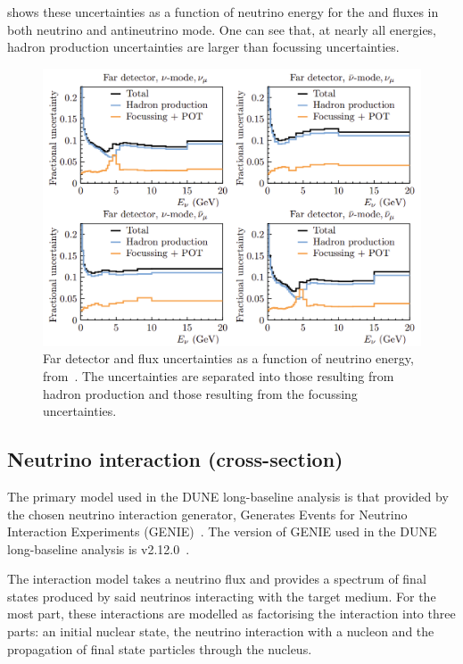 shows these uncertainties as a function of neutrino energy for the \numu and \anumu fluxes in both neutrino and antineutrino mode.
One can see that, at nearly all energies, hadron production uncertainties are larger than focussing uncertainties.

\begin{figure}[h]
  \centering
  \includegraphics[width=.8\linewidth]{files/figures/dune_detector/fluxUncertainties}
  \caption[Far detector flux uncertainties for \numu and \anumu]{Far detector \numu and \anumu flux uncertainties as a function of neutrino energy, from~\cite{tdrVol2}. The uncertainties are separated into those resulting from hadron production and those resulting from the focussing uncertainties.}
  \label{fig:fluxUncertainties}
\end{figure}

\subsection{Neutrino interaction (cross-section)}
\label{sec:dune_lbl:systs:xsec}

The primary model used in the DUNE long-baseline analysis is that provided by the chosen neutrino interaction generator, Generates Events for Neutrino Interaction Experiments (GENIE)~\cite{genie}.
The version of GENIE used in the DUNE long-baseline analysis is v2.12.0~\cite{tdrVol2}.

The interaction model takes a neutrino flux and provides a spectrum of final states produced by said neutrinos interacting with the target medium.
For the most part, these interactions are modelled as factorising the interaction into three parts: an initial nuclear state, the neutrino interaction with a nucleon and the propagation of final state particles through the nucleus.

